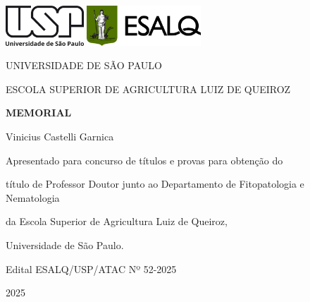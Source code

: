 \documentclass[12pt,a4paper,oneside]{book}
\newcommand{\Year}{2025}
\newcommand{\Author}{Vinicius Castelli Garnica}
\newcommand{\Title}{Memorial}
\begin{document}
\pagestyle{plain}
\frontmatter


\begin{titlepage}
  \begin{center}
    \includegraphics[height=1.5cm]{images/usp.png}
    \hspace{1cm}
    \includegraphics[height=1.5cm]{images/esalq.png}
    \vspace{1cm}

    UNIVERSIDADE DE SÃO PAULO

    ESCOLA SUPERIOR DE AGRICULTURA LUIZ DE QUEIROZ
    \vspace{5cm}

    \textbf{\huge \MakeUppercase{\Title}}
    \vspace{2cm}

    {\Large \Author}
    \vspace{5cm}

    {\small
      Apresentado para concurso de títulos e provas para obtenção do

      título de Professor Doutor junto ao Departamento de Fitopatologia e Nematologia

      da Escola Superior de Agricultura Luiz de Queiroz,

      Universidade de São Paulo.
      \vspace{1cm}

      Edital ESALQ/USP/ATAC Nº 52-2025
    }
    \vfill

    \Year{}
  \end{center}
\end{titlepage}
\end{document}
